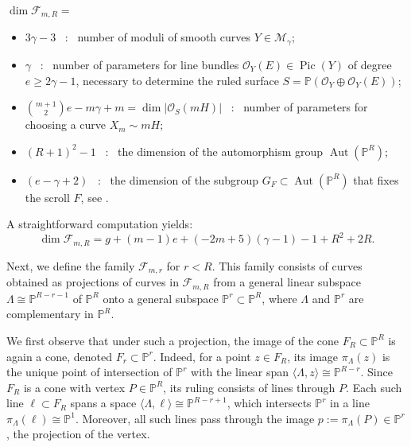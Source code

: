 \documentclass[a4paper,12pt]{amsart}
\def\dim{\operatorname{dim}}
\def\Pic{\operatorname{Pic}}%
\def\Aut{\operatorname{Aut}}%
\begin{document}
\noindent $\dim \mathcal{F}_{m,R} = $
\begin{itemize}[font=\sffamily, leftmargin=1.3cm, style=nextline]
     \item[$ + $] $3\gamma - 3$ \ : \ number of moduli of smooth curves $Y \in \mathcal{M}_{ \gamma }$;

     \item[$ + $] $\gamma$ \ : \ number of parameters for line bundles $\mathcal{O}_{Y} (E) \in \Pic (Y)$ of degree $e \geq 2\gamma - 1$, necessary to determine the ruled surface $S = \mathbb{P} (\mathcal{O}_{Y} \oplus \mathcal{O}_{Y} (E))$;

     \item[$ + $] $\binom{m+1}{2}e - m\gamma + m = \dim |\mathcal{O}_S (mH)|$ \ : \ number of parameters for choosing a curve  $X_m \sim mH$;

     \item[$ + $] $(R+1)^2 - 1$ \ : \ the dimension of the automorphism group $\Aut(\mathbb{P}^R)$;

     \item[$ - $] $(e- \gamma + 2)$ \ : \ the dimension of the subgroup $G_F \subset \Aut(\mathbb{P}^R)$ that fixes the scroll $F$, see \cite[Lemma~6.4, p.~148]{CCFM2009}.
\end{itemize}
A straightforward computation yields:
\begin{equation}\label{Sec3_DimFmR}
 \dim \mathcal{F}_{m,R} = g+(m-1)e+(-2m+5)(\gamma - 1)-1 + R^2 + 2R .
\end{equation}

\medskip

Next, we define the family $\mathcal{F}_{m,r}$ for $r < R$. This family consists of curves obtained as projections of curves in $\mathcal{F}_{m,R}$ from a general linear subspace $\Lambda \cong \mathbb{P}^{R - r - 1}$ of $\mathbb{P}^R$ onto a general subspace $\mathbb{P}^r \subset \mathbb{P}^R$, where $\Lambda$ and $\mathbb{P}^r$ are complementary in $\mathbb{P}^R$.

We first observe that under such a projection, the image of the cone $F_R \subset \mathbb{P}^R$ is again a cone, denoted $F_r \subset \mathbb{P}^r$. Indeed, for a point $z \in F_R$, its image $\pi_{\Lambda}(z)$ is the unique point of intersection of $\mathbb{P}^r$ with the linear span $\langle \Lambda, z \rangle \cong \mathbb{P}^{R - r}$. Since $F_R$ is a cone with vertex $P \in \mathbb{P}^R$, its ruling consists of lines through $P$. Each such line $\ell \subset F_R$ spans a space $\langle \Lambda, \ell \rangle \cong \mathbb{P}^{R - r + 1}$, which intersects $\mathbb{P}^r$ in a line $\pi_{\Lambda}(\ell) \cong \mathbb{P}^1$. Moreover, all such lines pass through the image $p := \pi_{\Lambda}(P) \in \mathbb{P}^r$, the projection of the vertex.
\end{document}
